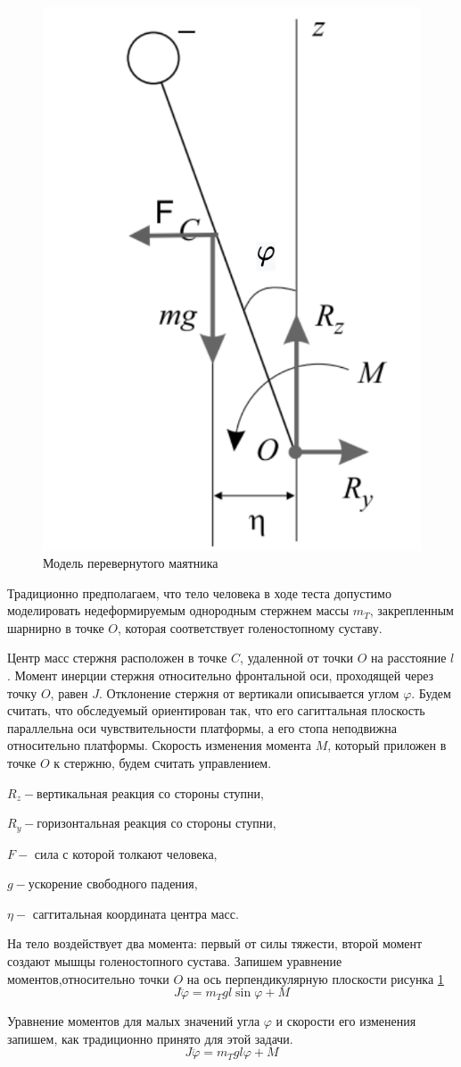 \documentclass[a4paper,12pt, openany]{book}
\theoremstyle{plain} %
\theoremstyle{definition} %
\theoremstyle{remark} %
\numberwithin{equation}{chapter}
\begin{document}
{\begin{figure}[h!]
    \centering
    \includegraphics[width=0.4\linewidth]{body_1.pdf}
    \caption{Модель перевернутого маятника}
    \label{fig:pendulum}
\end{figure}

Традиционно предполагаем, что тело человека в ходе теста допустимо
моделировать недеформируемым однородным стержнем массы $m_T$,
закрепленным шарнирно в точке $O$, которая соответствует
голеностопному суставу.

Центр масс стержня расположен в точке $C$, удаленной от точки $O$
на расстояние $l$. Момент инерции стержня относительно фронтальной
оси, проходящей через точку $O$, равен $J$. Отклонение стержня от
вертикали описывается углом $\varphi$. Будем считать, что обследуемый
ориентирован так, что его сагиттальная плоскость параллельна оси
чувствительности платформы, а его стопа неподвижна относительно
платформы. Скорость изменения момента $M$, который приложен в точке $O$ к стержню,
будем считать управлением.

$R_z - $вертикальная реакция со стороны ступни,

$R_y - $горизонтальная реакция со стороны ступни,

$F - $ сила с которой толкают человека,

$g - $ускорение свободного падения,

$\eta - $ саггитальная координата центра масс.

На тело воздействует два момента: первый от силы тяжести, второй момент создают мышцы голеностопного сустава.
Запишем уравнение моментов,относительно точки $O$ на ось перпендикулярную плоскости рисунка \ref{fig:pendulum}
\[
    J\ddot{\varphi}= m_Tgl\sin\varphi+M
\]

Уравнение моментов для малых значений угла $\varphi$ и
скорости его изменения запишем, как традиционно принято для этой задачи.
\[
    J\ddot{\varphi}= m_Tgl\varphi+M
\]

}
\end{document}
